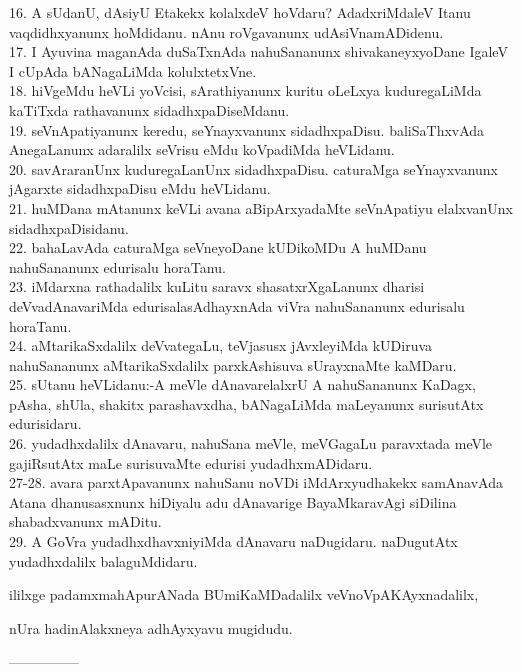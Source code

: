 \documentclass{article}
\begin{document}
16. A sUdanU, dAsiyU Etakekx kolalxdeV hoVdaru? AdadxriMdaleV Itanu vaqdidhxyanunx hoMdidanu. nAnu roVgavanunx udAsiVnamADidenu.\\
17. I Ayuvina maganAda duSaTxnAda nahuSananunx shivakaneyxyoDane IgaleV I cUpAda bANagaLiMda kolulxtetxVne.\\
18. hiVgeMdu heVLi yoVcisi, sArathiyanunx kuritu oLeLxya kuduregaLiMda kaTiTxda rathavanunx sidadhxpaDiseMdanu.\\
19. seVnApatiyanunx keredu, seYnayxvanunx sidadhxpaDisu. baliSaThxvAda AnegaLanunx adaralilx seVrisu eMdu koVpadiMda heVLidanu.\\
20. savAraranUnx kuduregaLanUnx sidadhxpaDisu. caturaMga seYnayxvanunx jAgarxte sidadhxpaDisu eMdu heVLidanu.\\
21. huMDana mAtanunx keVLi avana aBipArxyadaMte seVnApatiyu elalxvanUnx sidadhxpaDisidanu.\\
22. bahaLavAda caturaMga seVneyoDane kUDikoMDu A huMDanu nahuSananunx edurisalu horaTanu.\\
23. iMdarxna rathadalilx kuLitu saravx shasatxrXgaLanunx dharisi deVvadAnavariMda edurisalasAdhayxnAda viVra nahuSananunx edurisalu horaTanu.\\
24. aMtarikaSxdalilx deVvategaLu, teVjasusx jAvxleyiMda kUDiruva nahuSananunx aMtarikaSxdalilx parxkAshisuva sUrayxnaMte kaMDaru.\\
25. sUtanu heVLidanu:-A meVle dAnavarelalxrU A nahuSananunx KaDagx, pAsha, shUla, shakitx parashavxdha, bANagaLiMda maLeyanunx surisutAtx edurisidaru.\\
26. yudadhxdalilx dAnavaru, nahuSana meVle, meVGagaLu paravxtada meVle gajiRsutAtx maLe surisuvaMte edurisi yudadhxmADidaru.\\
27-28. avara parxtApavanunx nahuSanu noVDi iMdArxyudhakekx samAnavAda Atana dhanusasxnunx hiDiyalu adu dAnavarige BayaMkaravAgi siDilina shabadxvanunx mADitu.\\
29. A GoVra yudadhxdhavxniyiMda dAnavaru naDugidaru. naDugutAtx yudadhxdalilx balaguMdidaru.

\begin{center}
ililxge padamxmahApurANada BUmiKaMDadalilx veVnoVpAKAyxnadalilx,
\end{center}

\begin{center}
nUra hadinAlakxneya adhAyxyavu mugidudu.
\end{center}

\begin{center}
---------------
\end{center}
\end{document}
